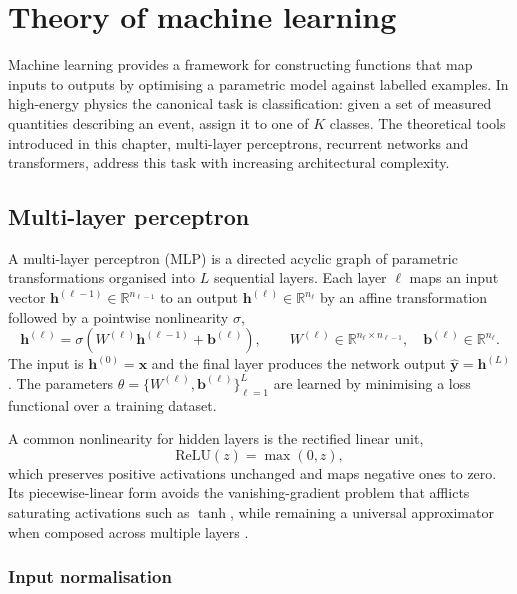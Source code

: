\chapter{Theory of machine learning}
\label{chap:ml}

Machine learning provides a framework for constructing functions that map inputs to outputs by optimising a parametric model against labelled examples.  In high-energy physics the canonical task is classification: given a set of measured quantities describing an event, assign it to one of $K$ classes.  The theoretical tools introduced in this chapter, multi-layer perceptrons, recurrent networks and transformers, address this task with increasing architectural complexity.

\section{Multi-layer perceptron}

A multi-layer perceptron (MLP) is a directed acyclic graph of parametric transformations organised into $L$ sequential layers.  Each layer $\ell$ maps an input vector $\mathbf{h}^{(\ell-1)}\in\mathbb{R}^{n_{\ell-1}}$ to an output $\mathbf{h}^{(\ell)}\in\mathbb{R}^{n_{\ell}}$ by an affine transformation followed by a pointwise nonlinearity $\sigma$,
\begin{equation}
\mathbf{h}^{(\ell)} = \sigma\!\left(W^{(\ell)}\mathbf{h}^{(\ell-1)} + \mathbf{b}^{(\ell)}\right), \qquad W^{(\ell)}\in\mathbb{R}^{n_{\ell}\times n_{\ell-1}},\quad \mathbf{b}^{(\ell)}\in\mathbb{R}^{n_{\ell}}.
\end{equation}
The input is $\mathbf{h}^{(0)}=\mathbf{x}$ and the final layer produces the network output $\hat{\mathbf{y}}=\mathbf{h}^{(L)}$.  The parameters $\theta=\{W^{(\ell)},\mathbf{b}^{(\ell)}\}_{\ell=1}^{L}$ are learned by minimising a loss functional over a training dataset.

A common nonlinearity for hidden layers is the rectified linear unit,
\begin{equation}
\mathrm{ReLU}(z) = \max(0,z),
\end{equation}
which preserves positive activations unchanged and maps negative ones to zero.  Its piecewise-linear form avoids the vanishing-gradient problem that afflicts saturating activations such as $\tanh$, while remaining a universal approximator when composed across multiple layers \cite{Hornik_Universal_1989}.
\subsection{Input normalisation}
\label{sec:normalisation}

